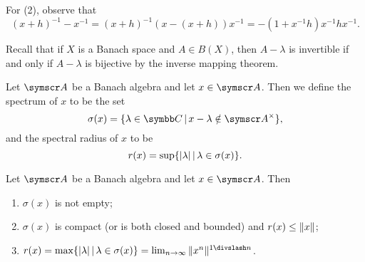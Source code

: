 \begin{hint}
  For (2), observe that
  \begin{equation}
    (x+h)^{-1}-x^{-1}=(x+h)^{-1}(x-(x+h))x^{-1}=-(1+x^{-1}h)x^{-1}hx^{-1}.
  \end{equation}
\end{hint}

Recall that if $X$ is a Banach space and $A\in B(X)$, then $A-\lambda$ is invertible if and only if $A-\lambda$ is bijective by the inverse mapping theorem.

\begin{definition}
  Let $\BA A$ be a Banach algebra and let $x\in \BA A$. Then we define the spectrum of $x$ to be the set
  \begin{equation*}
    \sigma(x)=\{\lambda\in \CC\VERT x-\lambda\notin \BA{A}^{\times}\},
  \end{equation*}
  and the spectral radius of $x$ to be
  \begin{equation*}
    r(x)=\sup\{\vert\lambda\vert\,\vert\, \lambda\in \sigma(x)\}.
  \end{equation*}
\end{definition}

\begin{proposition}
  Let $\BA A$ be a Banach algebra and let $x\in \BA A$. Then
  \begin{enumerate}
    \item $\sigma(x)$ is not empty;
    \item $\sigma(x)$ is compact (or is both closed and bounded) and $r(x)\leq \Vert x\Vert$;
    \item $r(x)=\max\{\ABS{\lambda}\VERT \lambda\in \sigma(x)\}=\lim_{n\to\infty}\NORM{x^n}^{1\DIV n}$.
  \end{enumerate}
\end{proposition}


